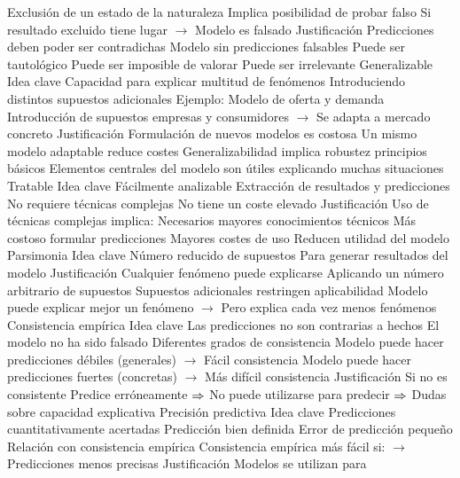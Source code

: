 \documentclass{nuevotema}
\begin{document}
\begin{esquemal}
				\4 Exclusión de un estado de la naturaleza
				\4[] Implica posibilidad de probar falso
				\4[] Si resultado excluido tiene lugar
				\4[] $\to$ Modelo es falsado
			\3 Justificación
				\4 Predicciones deben poder ser contradichas
				\4 Modelo sin predicciones falsables
				\4[] Puede ser tautológico
				\4[] Puede ser imposible de valorar
				\4[] Puede ser irrelevante
		\2 Generalizable
			\3 Idea clave
				\4 Capacidad para explicar multitud de fenómenos
				\4[] Introduciendo distintos supuestos adicionales
				\4 Ejemplo:
				\4[] Modelo de oferta y demanda
				\4[] Introducción de supuestos empresas y consumidores
				\4[] $\to$ Se adapta a mercado concreto
			\3 Justificación
				\4 Formulación de nuevos modelos es costosa
				\4[] Un mismo modelo adaptable reduce costes
				\4 Generalizabilidad implica robustez principios básicos
				\4[] Elementos centrales del modelo son útiles
				\4[] explicando muchas situaciones
		\2 Tratable
			\3 Idea clave
				\4 Fácilmente analizable
				\4 Extracción de resultados y predicciones
				\4[] No requiere técnicas complejas
				\4[] No tiene un coste elevado
			\3 Justificación
				\4 Uso de técnicas complejas implica:
				\4[] Necesarios mayores conocimientos técnicos
				\4[] Más costoso formular predicciones
				\4 Mayores costes de uso
				\4[] Reducen utilidad del modelo
		\2 Parsimonia
			\3 Idea clave
				\4 Número reducido de supuestos
				\4[] Para generar resultados del modelo
			\3 Justificación
				\4 Cualquier fenómeno puede explicarse
				\4[] Aplicando un número arbitrario de supuestos
				\4 Supuestos adicionales restringen aplicabilidad
				\4[] Modelo puede explicar mejor un fenómeno
				\4[] $\to$ Pero explica cada vez menos fenómenos
		\2 Consistencia empírica
			\3 Idea clave
				\4 Las predicciones no son contrarias a hechos
				\4[] El modelo no ha sido falsado
				\4 Diferentes grados de consistencia
				\4[] Modelo puede hacer predicciones débiles (generales)
				\4[] $\to$ Fácil consistencia
				\4[] Modelo puede hacer predicciones fuertes (concretas)
				\4[] $\to$ Más difícil consistencia
			\3 Justificación
				\4 Si no es consistente
				\4[] Predice erróneamente
				\4[] $\Rightarrow$ No puede utilizarse para predecir
				\4[] $\Rightarrow$ Dudas sobre capacidad explicativa
		\2 Precisión predictiva
			\3 Idea clave
				\4 Predicciones cuantitativamente acertadas
				\4[] Predicción bien definida
				\4[] Error de predicción pequeño
				\4 Relación con consistencia empírica
				\4[] Consistencia empírica más fácil si:
				\4[] $\to$ Predicciones menos precisas
			\3 Justificación
				\4 Modelos se utilizan para

\end{esquemal}
\end{document}
